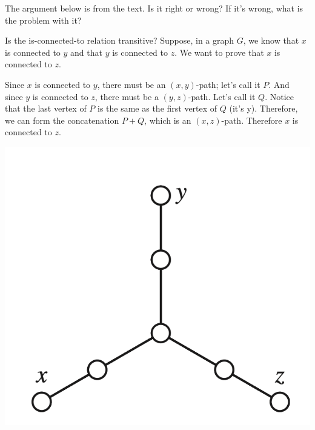 \documentclass[10pt]{beamer}
\begin{document}
\begin{frame}

\begin{mygreenbox}[title=\text{Reading quiz (Connection)}]

The argument below is from the text.  Is it right or wrong?  If it's wrong, what is the problem with it?
\end{mygreenbox}
\vfill 
\begin{myyellowbox}[title=\text{Reference passage from text}]
\begin{minipage}{.68\textwidth}
Is the is-connected-to relation transitive? Suppose, in a graph $G$, we know that $x$ is connected to $y$ and that $y$ is connected to $z$.  We want to prove that $x$ is connected to $z$. \\
\vspace{.15cm}

Since $x$ is connected to $y$, there must be an $(x,y)$-path; let's call it $P$.  And since $y$ is connected to $z$, there must be a $(y,z)$-path.  Let's call it $Q$.  Notice that the last vertex of $P$ is the same as the first vertex of $Q$ (it's y).  Therefore, we can form the concatenation $P+Q$, which is an $(x,z)$-path.  Therefore $x$ is connected to $z$.
\end{minipage} %
\hfill 
\begin{minipage}{.28\textwidth}
\includegraphics[width=\linewidth]{images/transitivity_of_connection.png}
\end{minipage}

\end{myyellowbox}

\end{frame}
\end{document}
